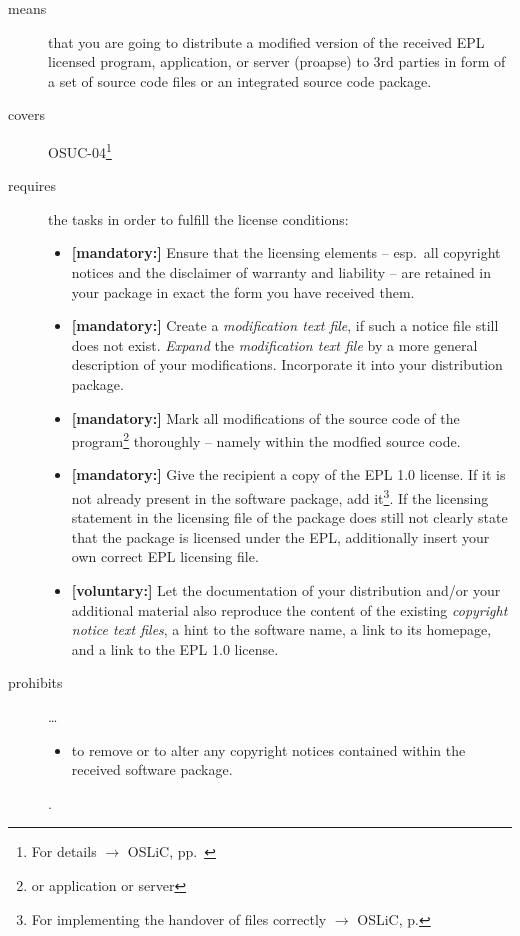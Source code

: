\begin{description}
\item[means] that you are going to distribute a modified version of the received
EPL licensed program, application, or server (proapse) to 3rd parties in form
of a set of source code files or an integrated source code package.
\item[covers] OSUC-04\footnote{For details $\rightarrow$ OSLiC, pp.\ \pageref{OSUC-04-DEF}}
\item[requires] the tasks in order to fulfill the license conditions:
\begin{itemize}
  
  \item \textbf{[mandatory:]} Ensure that the licensing elements -- esp.\ all
  copyright notices and the disclaimer of warranty and liability -- are retained
  in your package in exact the form you have received them.
  
  \item \textbf{[mandatory:]} Create a \emph{modification text file}, if such a
  notice file still does not exist. \emph{Expand} the \emph{modification text
  file} by a more general description of your modifications. Incorporate it into
  your distribution package.
  
  \item \textbf{[mandatory:]} Mark all modifications of the source code of the
  program\footnote{or application or server} thoroughly -- namely within the
  modfied source code.
  
  \item \textbf{[mandatory:]} Give the recipient a copy of the EPL 1.0 license.
  If it is not already present in the software package, add it\footnote{For
  implementing the handover of files correctly $\rightarrow$ OSLiC, p.
  \pageref{DistributingFilesHint}}. If the licensing statement in the licensing
  file of the package does still not clearly state that the package is licensed
  under the EPL, additionally insert your own correct EPL licensing file.

  \item \textbf{[voluntary:]} Let the documentation of your distribution and/or
  your additional material also reproduce the content of the existing
  \emph{copyright notice text files}, a hint to the software name, a link to its
  homepage, and a link to the EPL 1.0 license.
  
 \end{itemize}
 
\item[prohibits] \ldots
\begin{itemize}
  \item to remove or to alter any copyright notices contained within the
  received software package.
\end{itemize}.

\end{description}

